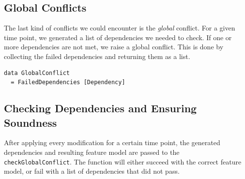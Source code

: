 \documentclass[a4paper,english]{ifimaster}
\begin{document}
\subsection{Global Conflicts}%
\label{sub:global_conflicts}

The last kind of conflicts we could encounter is the \textit{global} conflict. For a given time point, we generated a list of dependencies we needed to check. If one or more dependencies are not met, we raise a global conflict. This is done by collecting the failed dependencies and returning them as a list.

\begin{verbatim}
data GlobalConflict
  = FailedDependencies [Dependency]
\end{verbatim}

\subsection{Checking Dependencies and Ensuring Soundness}%
\label{sub:checking_dependencies_and_ensuring_soundness}

After applying every modification for a certain time point, the generated dependencies and resulting feature model are passed to the \texttt{checkGlobalConflict}. The function will either succeed with the correct feature model, or fail with a list of dependencies that did not pass.
\end{document}
